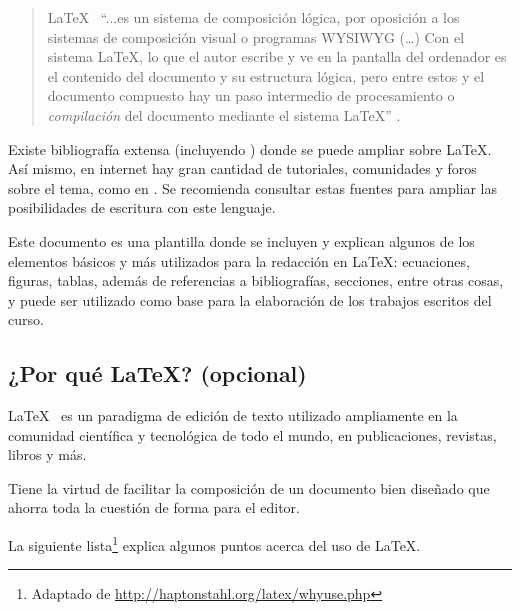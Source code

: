 \documentclass[12pt,letterpaper]{article}
\begin{document}
\begin{quote}
\LaTeX~ ``...es un sistema de composición lógica, por oposición a los sistemas de composición visual o programas WYSIWYG (\ldots) Con el sistema \LaTeX, lo que el autor escribe y ve en la pantalla del ordenador es el contenido del documento y su estructura lógica, pero entre estos y el documento compuesto hay un paso intermedio de procesamiento o \emph{compilación} del documento mediante el sistema \LaTeX'' \cite{Valiente2001}.
\end{quote}

Existe bibliografía extensa (incluyendo \cite{Valiente2001}\cite{Gratzer2001}\cite{Krishnan2003}\cite{Oetiker2014}\cite{Wikibooks2016}) donde se puede ampliar sobre \LaTeX. Así mismo, en internet hay gran cantidad de tutoriales, comunidades y foros sobre el tema, como en \cite{StackExchange2016}. Se recomienda consultar estas fuentes para ampliar las posibilidades de escritura con este lenguaje.

Este documento es una plantilla donde se incluyen y explican algunos de los elementos básicos y más utilizados para la redacción en \LaTeX: ecuaciones, figuras, tablas, además de referencias a bibliografías, secciones, entre otras cosas, y puede ser utilizado como base para la elaboración de los trabajos escritos del curso.


\subsection{¿Por qué \LaTeX? (opcional)}

\LaTeX~ es un paradigma de edición de texto utilizado ampliamente en la comunidad científica y tecnológica de todo el mundo, en publicaciones, revistas, libros y más. 

Tiene la virtud de facilitar la composición de un documento bien diseñado que ahorra toda la cuestión de forma para el editor.

La siguiente lista\footnote{Adaptado de \url{http://haptonstahl.org/latex/whyuse.php}} explica algunos puntos acerca del uso de \LaTeX.
\end{document}

